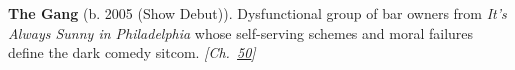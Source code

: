 \textbf{The Gang} (b. 2005 (Show Debut)). Dysfunctional group of bar owners from \emph{It's Always Sunny in Philadelphia} whose self-serving schemes and moral failures define the dark comedy sitcom. \emph{[Ch.~\hyperref[ch:consciousness]{50}]}

